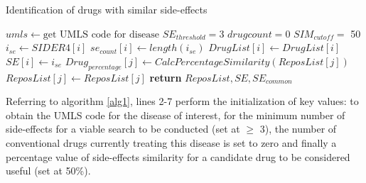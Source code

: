 \documentclass[preprint,11pt]{elsarticle}
\begin{document}
\begin{algorithm}
\caption{Identification of drugs with similar side-effects}\label{alg1}
\begin{algorithmic}[1]
\scriptsize
{}
   \State $umls \gets \mbox {get UMLS code for disease}$
   \State $SE_{threshold} = 3$
   \State $drugcount =0$
   \State $SIM_{cutoff} =$ 50
           \State \textit{$i_{se} \gets SIDER4[i]$}
           \State \texttt{$se_{count}[i] \gets length(i_{se})$}
            \State \texttt{$DrugList[i] \gets DrugList[i]$}
            \State \texttt{$SE[i] \gets i_{se}$}
            \EndIf
   \EndFor  
                   \State \textit{$Drug_{percentage}[j] \gets CalcPercentageSimilarity(ReposList[j])$  }\Comment{}
                   \State \texttt{$ReposList[j] \gets ReposList[j]$}
                   \EndIf
                \EndFor
       \State \textbf{return} $ReposList, SE, SE_{common}$ 
\EndProcedure
\normalsize
\end{algorithmic}
\end{algorithm}

Referring to algorithm \ref{alg1}, lines 2-7 perform the initialization of key values: to obtain the UMLS code for the disease of interest, for the minimum number of side-effects for a viable search to be conducted (set at $\geq$ 3), the number of conventional drugs currently treating this disease is set to zero and finally a percentage value of side-effects similarity for a candidate drug to be considered useful (set at 50\%). 
\end{document}
